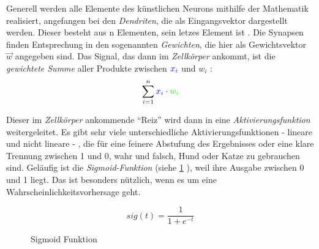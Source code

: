 \documentclass[parskip=half,titlepage]{scrartcl}
\begin{document}
Generell werden alle Elemente des künstlichen Neurons mithilfe der Mathematik realisiert, angefangen bei den \textit{Dendriten}, die als Eingangsvektor \color{blue}{$\overrightarrow x$} \color{black} dargestellt werden. Dieser besteht aus n Elementen, sein letzes Element ist \color{blue}{$x_n$} \color{black}. Die Synapsen finden Entsprechung in den sogenannten \textit{Gewichten}, die hier als Gewichtsvektor \color{green} $\overrightarrow w$ \color{black} angegeben sind. Das Signal, das dann im \textit{Zellkörper} ankommt, ist die \textit{gewichtete Summe} aller Produkte zwischen $\color{blue} x_i$ \color{black} und \color{green} $w_i$ \color{black}:
\begin{displaymath}
 \sum_{i=1}^{n} \color{blue} x_i \color{black} \cdot \color{green} w_i
\end{displaymath}
\color{black}

Dieser im \textit{Zellkörper} ankommende ``Reiz'' wird dann in eine \textit{Aktivierungsfunktion} weitergeleitet. Es gibt sehr viele unterschiedliche Aktivierungsfunktionen - lineare und nicht lineare - , die für eine feinere Abstufung des Ergebnisses oder eine klare Trennung zwischen 1 und 0, wahr und falsch, Hund oder Katze zu gebrauchen sind. Geläufig ist die \textit{Sigmoid-Funktion} (siehe \cref{fig:sigmoid} ), weil ihre Ausgabe zwischen 0 und 1 liegt. Das ist besonders nützlich, wenn es um eine Wahrscheinlichkeitsvorhersage geht.


\begin{figure}[h]
\begin{minipage}{.3\textwidth}
  \centering
  \begin{displaymath}
   sig(t) = \frac{1}{1 + e^{-t}}
  \end{displaymath}
\end{minipage}%
\begin{minipage}{0.6\textwidth}
  \centering
  \label{fig:sigmoid}
\end{minipage}
\caption{Sigmoid Funktion}
\label{fig:sigmoid}
\end{figure}
\end{document}
